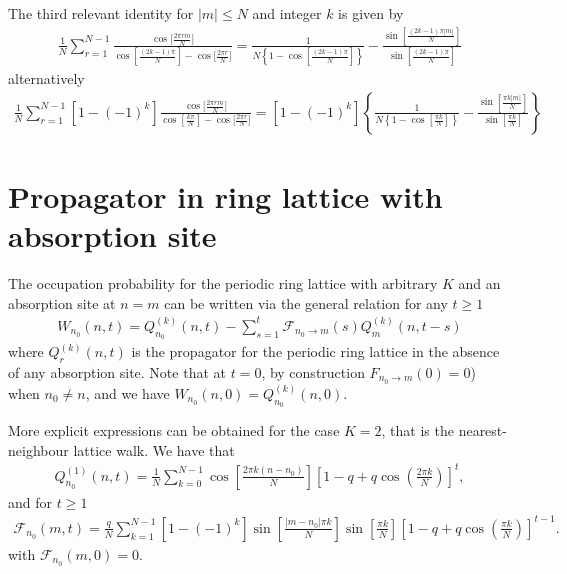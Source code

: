 \documentclass[idelinks, superscriptaddress, amsmath, amssymb, aps, pre]{revtex4-2}
\begin{document}
The third relevant identity for $|m|\leq N$ and integer $k$ is given by
\begin{align}
\frac{1}{N}\sum_{r=1}^{N-1}\frac{\cos\Big[\frac{2\pi r m}{N}\Big]}{\cos\left[\frac{(2k-1)\pi}{N}\right]-\cos\Big[\frac{2\pi r}{N}\Big]}=\frac{1}{N\left\{1-\cos\left[\frac{(2k-1)\pi}{N}\right]\right\}}-\frac{\sin\left[\frac{(2k-1)\pi |m|}{N}\right]}{\sin\left[\frac{(2k-1)\pi }{N}\right]}
\label{eq:id_3}
\end{align}
alternatively
\begin{align}
\frac{1}{N}\sum_{r=1}^{N-1}\left[1-(-1)^k\right]\frac{\cos\Big[\frac{2\pi r m}{N}\Big]}{\cos\left[\frac{k\pi}{N}\right]-\cos\Big[\frac{2\pi r}{N}\Big]}=\left[1-(-1)^k\right]\left\{\frac{1}{N\left\{1-\cos\left[\frac{\pi k}{N}\right]\right\}}-\frac{\sin\left[\frac{\pi k |m|}{N}\right]}{\sin\left[\frac{\pi k}{N}\right]}\right\}
\label{eq:id_4}
\end{align}

\section*{Propagator in ring lattice with absorption site}

The occupation probability for the periodic ring lattice with arbitrary $K$ and an absorption site at $n=m$ can be written via the general relation for any $t\geq 1$
\begin{align}
W_{n_0}(n,t)=Q^{(k)}_{n_0}(n,t)-\sum_{s=1}^{t}\mathcal{F}_{n_0\to m}(s)Q^{(k)}_{m}(n,t-s)
\label{eq:Abs_prop_ring}
\end{align}
where $Q^{(k)}_{r}(n,t)$ is the propagator for the periodic ring lattice in the absence of any absorption site. Note that at $t=0$, by construction $F_{n_0\to m}(0)=0$) when $n_0\not= n$, and we have $W_{n_0}(n,0)=Q^{(k)}_{n_0}(n,0)$.

More explicit expressions can be obtained for the case $K=2$, that is the nearest-neighbour lattice walk. We have that
\begin{align}
Q^{(1)}_{n_0}(n,t)=\frac{1}{N}\sum_{k=0}^{N-1}\cos\left[\frac{2\pi k (n-n_0)}{N}\right]\left[1-q+q\cos\left(\frac{2\pi k}{N}\right)\right]^t,
\label{eq:Q1}
\end{align}
and for $t\geq 1$
\begin{align}
\mathcal{F}_{n_0}(m,t)=\frac{q}{N}\sum_{k=1}^{N-1}\left[1-(-1)^k\right]\sin\left[\frac{|m-n_0|\pi k}{N}\right]\sin\left[\frac{\pi k}{N}\right]\left[1-q+q\cos\left(\frac{\pi k}{N}\right)\right]^{t-1}.
\label{eq:fp_0}
\end{align}
with $\mathcal{F}_{n_0}(m,0)=0$.
\end{document}

